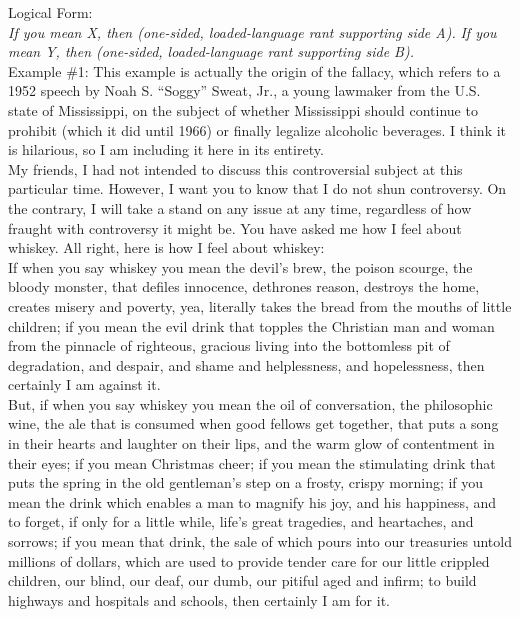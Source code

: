 \documentclass[a4paper,12pt,single,pdftex]{scrartcl}
\begin{document}
    
      Logical Form:
    \\

    
      {\em If you mean X, then (one-sided, loaded-language rant supporting side A).} \newline
{\em If you mean Y, then (one-sided, loaded-language rant supporting side B).}
    \\

    
      Example \#1: This example is actually the origin of the fallacy, which refers to a 1952 speech by Noah S. “Soggy” Sweat, Jr., a young lawmaker from the U.S. state of Mississippi, on the subject of whether Mississippi should continue to prohibit (which it did until 1966) or finally legalize alcoholic beverages.  I think it is hilarious, so I am including it here in its entirety.
    \\

    
      My friends, I had not intended to discuss this controversial subject at this particular time. However, I want you to know that I do not shun controversy. On the contrary, I will take a stand on any issue at any time, regardless of how fraught with controversy it might be. You have asked me how I feel about whiskey. All right, here is how I feel about whiskey:
    \\

    
      If when you say whiskey you mean the devil’s brew, the poison scourge, the bloody monster, that defiles innocence, dethrones reason, destroys the home, creates misery and poverty, yea, literally takes the bread from the mouths of little children; if you mean the evil drink that topples the Christian man and woman from the pinnacle of righteous, gracious living into the bottomless pit of degradation, and despair, and shame and helplessness, and hopelessness, then certainly I am against it.
    \\

    
      But, if when you say whiskey you mean the oil of conversation, the philosophic wine, the ale that is consumed when good fellows get together, that puts a song in their hearts and laughter on their lips, and the warm glow of contentment in their eyes; if you mean Christmas cheer; if you mean the stimulating drink that puts the spring in the old gentleman’s step on a frosty, crispy morning; if you mean the drink which enables a man to magnify his joy, and his happiness, and to forget, if only for a little while, life’s great tragedies, and heartaches, and sorrows; if you mean that drink, the sale of which pours into our treasuries untold millions of dollars, which are used to provide tender care for our little crippled children, our blind, our deaf, our dumb, our pitiful aged and infirm; to build highways and hospitals and schools, then certainly I am for it.
    \\
\end{document}
